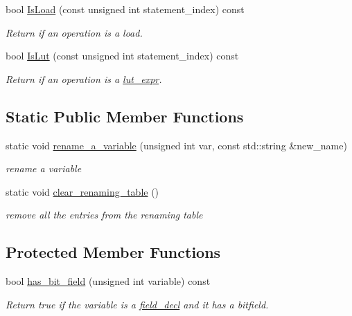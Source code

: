 \begin{DoxyCompactItemize}
bool \hyperlink{classBehavioralHelper_a39727c79473322e5994e5f5497c179ce}{Is\+Load} (const unsigned int statement\+\_\+index) const
\begin{DoxyCompactList}\small\item\em Return if an operation is a load. \end{DoxyCompactList}\item 
bool \hyperlink{classBehavioralHelper_ab73c076216b524091752657d4c399fda}{Is\+Lut} (const unsigned int statement\+\_\+index) const
\begin{DoxyCompactList}\small\item\em Return if an operation is a \hyperlink{structlut__expr}{lut\+\_\+expr}. \end{DoxyCompactList}\end{DoxyCompactItemize}
\subsection*{Static Public Member Functions}
\begin{DoxyCompactItemize}
\item 
static void \hyperlink{classBehavioralHelper_a0d259d6b58eddaddea64b85eb3047c63}{rename\+\_\+a\+\_\+variable} (unsigned int var, const std\+::string \&new\+\_\+name)
\begin{DoxyCompactList}\small\item\em rename a variable \end{DoxyCompactList}\item 
static void \hyperlink{classBehavioralHelper_a18f5452ae64b9e359fe631cf34740f08}{clear\+\_\+renaming\+\_\+table} ()
\begin{DoxyCompactList}\small\item\em remove all the entries from the renaming table \end{DoxyCompactList}\end{DoxyCompactItemize}
\subsection*{Protected Member Functions}
\begin{DoxyCompactItemize}
\item 
bool \hyperlink{classBehavioralHelper_a60077771dc29e3fddbbcfe9330b38030}{has\+\_\+bit\+\_\+field} (unsigned int variable) const
\begin{DoxyCompactList}\small\item\em Return true if the variable is a \hyperlink{structfield__decl}{field\+\_\+decl} and it has a bitfield. \end{DoxyCompactList}\end{DoxyCompactItemize}
